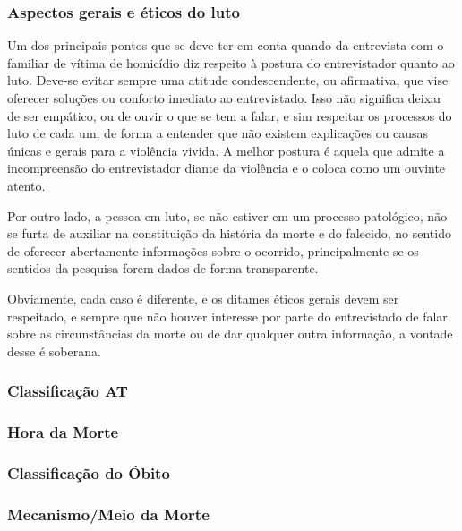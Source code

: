 \subsubsection{Aspectos gerais e éticos do luto}

Um dos principais pontos que se deve ter em conta quando da entrevista com o familiar de vítima de homicídio diz respeito à postura do entrevistador quanto ao luto. Deve-se evitar sempre uma atitude condescendente, ou afirmativa, que vise oferecer soluções ou conforto imediato ao entrevistado. Isso não significa deixar de ser empático, ou de ouvir o que se tem a falar, e sim respeitar os processos do luto de cada um, de forma a entender que não existem explicações ou causas únicas e gerais para a violência vivida. A melhor postura é aquela que admite a incompreensão do entrevistador diante da violência e o coloca como um ouvinte atento.

Por outro lado, a pessoa em luto, se não estiver em um processo patológico, não se furta de auxiliar na constituição da história da morte e do falecido, no sentido de oferecer abertamente informações sobre o ocorrido, principalmente se os sentidos da pesquisa forem dados de forma transparente.

Obviamente, cada caso é diferente, e os ditames éticos gerais devem ser respeitado, e sempre que não houver interesse por parte do entrevistado de falar sobre as circunstâncias da morte ou de dar qualquer outra informação, a vontade desse é soberana.



\subsubsection{Classificação AT}


\subsubsection{Hora da Morte}

\subsubsection{Classificação do Óbito}

\subsubsection{Mecanismo/Meio da Morte}


